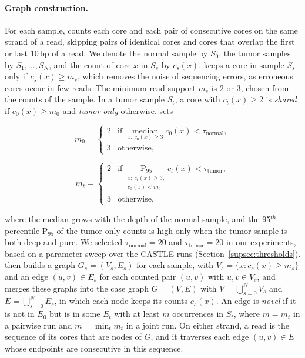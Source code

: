 \paragraph{Graph construction.}
For each sample, \tool counts each core and each pair of consecutive cores on the same strand of a read, skipping pairs of identical cores and cores that overlap the first or last 10\,bp of a read.
We denote the normal sample by $S_0$, the tumor samples by $S_1,\dots,S_N$, and the count of core $x$ in $S_s$ by $c_s(x)$.
\tool keeps a core in sample $S_s$ only if $c_s(x)\geq m_s$, which removes the noise of sequencing errors, as erroneous cores occur in few reads.
The minimum read support $m_s$ is 2 or 3, chosen from the counts of the sample.
In a tumor sample $S_t$, a core with $c_t(x)\geq 2$ is \emph{shared} if $c_0(x)\geq m_0$ and \emph{tumor-only} otherwise.
\tool sets
\par\noindent
\begin{minipage}{0.47\textwidth}
\begin{equation}
m_0=\begin{cases}2 & \text{if } \displaystyle\operatorname*{median}_{x:\,c_0(x)\geq 3} c_0(x)<\tau_{\mathrm{normal}},\\ 3 & \text{otherwise,}\end{cases}
\end{equation}
\end{minipage}\hfill
\begin{minipage}{0.51\textwidth}
\begin{equation}
m_t=\begin{cases}2 & \text{if } \displaystyle\operatorname*{P_{95}}_{\substack{x:\,c_t(x)\geq 3,\\ c_0(x)<m_0}} c_t(x)<\tau_{\mathrm{tumor}},\\ 3 & \text{otherwise,}\end{cases}
\end{equation}
\end{minipage}
\par\noindent
where the median grows with the depth of the normal sample, and the 95$^{th}$ percentile $\mathrm{P}_{95}$ of the tumor-only counts is high only when the tumor sample is both deep and pure.
We selected $\tau_{\mathrm{normal}}=20$ and $\tau_{\mathrm{tumor}}=20$ in our experiments, based on a parameter sweep over the CASTLE runs (Section~\ref{supsec:thresholds}).
\tool then builds a graph $G_s=(V_s,E_s)$ for each sample, with $V_s=\{x : c_s(x)\geq m_s\}$ and an edge $(u,v)\in E_s$ for each counted pair $(u,v)$ with $u,v\in V_s$, and merges these graphs into the case graph $G=(V,E)$ with $V=\bigcup_{s=0}^{N}V_s$ and $E=\bigcup_{s=0}^{N}E_s$, in which each node keeps its counts $c_s(x)$.
An edge is \emph{novel} if it is not in $E_0$ but is in some $E_t$ with at least $m$ occurrences in $S_t$, where $m=m_t$ in a pairwise run and $m=\min_t m_t$ in a joint run.
On either strand, a read is the sequence of its cores that are nodes of $G$, and it traverses each edge $(u,v)\in E$ whose endpoints are consecutive in this sequence.

